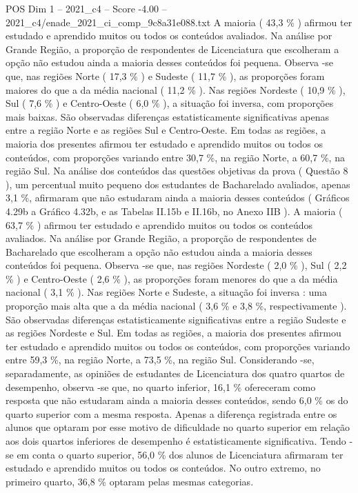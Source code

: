 \begin{textsample}{POS Dim 1 – 2021\_c4 – Score -4.00 – 2021\_c4/enade\_2021\_ci\_comp\_9c8a31e088.txt}
A maioria ( 43,3 \% ) afirmou ter estudado e aprendido muitos ou todos os conteúdos avaliados.
Na análise por Grande Região, a proporção de respondentes de Licenciatura que escolheram a opção não estudou ainda a maioria desses conteúdos foi pequena.
Observa -se que, nas regiões Norte ( 17,3 \% ) e Sudeste ( 11,7 \% ), as proporções foram maiores do que a da média nacional ( 11,2 \% ).
Nas regiões Nordeste ( 10,9 \% ), Sul ( 7,6 \% ) e Centro-Oeste ( 6,0 \% ), a situação foi inversa, com proporções mais baixas.
São observadas diferenças estatisticamente significativas apenas entre a região Norte e as regiões Sul e Centro-Oeste.
Em todas as regiões, a maioria dos presentes afirmou ter estudado e aprendido muitos ou todos os conteúdos, com proporções variando entre 30,7 \%, na região Norte, a 60,7 \%, na região Sul.
Na análise dos conteúdos das questões objetivas da prova ( Questão 8 ), um percentual muito pequeno dos estudantes de Bacharelado avaliados, apenas 3,1 \%, afirmaram que não estudaram ainda a maioria desses conteúdos ( Gráficos 4.29b a Gráfico 4.32b, e as Tabelas II.15b e II.16b, no Anexo IIB ).
A maioria ( 63,7 \% ) afirmou ter estudado e aprendido muitos ou todos os conteúdos avaliados.
Na análise por Grande Região, a proporção de respondentes de Bacharelado que escolheram a opção não estudou ainda a maioria desses conteúdos foi pequena.
Observa -se que, nas regiões Nordeste ( 2,0 \% ), Sul ( 2,2 \% ) e Centro-Oeste ( 2,6 \% ), as proporções foram menores do que a da média nacional ( 3,1 \% ).
Nas regiões Norte e Sudeste, a situação foi inversa : uma proporção mais alta que a da média nacional ( 3,6 \% e 3,8 \%, respectivamente ).
São observadas diferenças estatisticamente significativas entre a região Sudeste e as regiões Nordeste e Sul.
Em todas as regiões, a maioria dos presentes afirmou ter estudado e aprendido muitos ou todos os conteúdos, com proporções variando entre 59,3 \%, na região Norte, a 73,5 \%, na região Sul.
Considerando -se, separadamente, as opiniões de estudantes de Licenciatura dos quatro quartos de desempenho, observa -se que, no quarto inferior, 16,1 \% ofereceram como resposta que não estudaram ainda a maioria desses conteúdos, sendo 6,0 \% os do quarto superior com a mesma resposta.
Apenas a diferença registrada entre os alunos que optaram por esse motivo de dificuldade no quarto superior em relação aos dois quartos inferiores de desempenho é estatisticamente significativa.
Tendo -se em conta o quarto superior, 56,0 \% dos alunos de Licenciatura afirmaram ter estudado e aprendido muitos ou todos os conteúdos.
No outro extremo, no primeiro quarto, 36,8 \% optaram pelas mesmas categorias.

\end{textsample}

